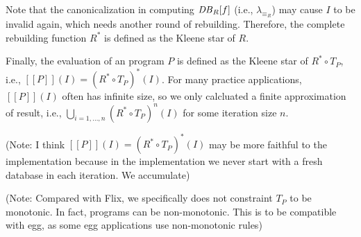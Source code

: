 Note that the canonicalization in computing $\mathit{DB}{}_R[f]$ 
 (i.e., $\lambda_{\equiv_R}$) may cause $I$ to be invalid again,
 which needs another round of rebuilding. 
Therefore, the complete rebuilding function $R^*$ is defined as the Kleene star of $R$.

Finally, the evaluation of an \egglog program $P$ is defined as the Kleene star of $R^*\circ T_P$, 
 i.e., $[\![P]\!](I)=(R^*\circ T_P)^*(I)$. 
For many practice applications, 
 $[\![P]\!](I)$ often has infinite size, 
 so we only calcluated a finite approximation of result, 
 i.e., $\bigcup_{i=1,\ldots,n}(R^*\circ T_P)^n(I)$ for some iteration size $n$.

(Note: I think $[\![P]\!](I)=(R^*\circ T_P)^*(I)$ may
be more faithful to the implementation because 
in the implementation we never start with a fresh database
in each iteration. We accumulate)

(Note: Compared with Flix, we specifically does not constraint $T_P$ to be monotonic. 
In fact, \egglog programs can be non-monotonic. 
This is to be compatible with egg, as some egg applications use non-monotonic rules)

\newpage